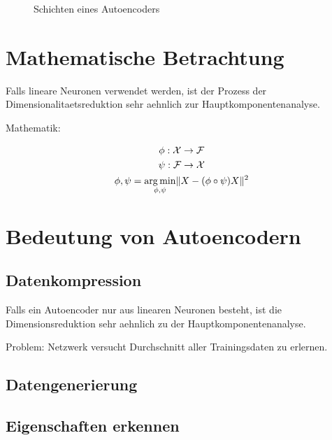 \begin{figure}[h!]
  \label{fi:nn_layers}
  \caption{Schichten eines Autoencoders}
\end{figure}

\section{Mathematische Betrachtung}
Falls lineare Neuronen verwendet werden, ist der Prozess der
Dimensionalitaetsreduktion sehr aehnlich zur Hauptkomponentenanalyse.

Mathematik:


\begin{gather}
  \phi: \mathcal{X} \to \mathcal{F}\\
  \psi: \mathcal{F} \to \mathcal{X}\\
  \displaystyle\phi,\psi = \operatorname*{\arg \min}_{\phi,\psi} \lVert X - (\phi \circ \psi)X\rVert^2
\end{gather}

\section{Bedeutung von Autoencodern}
\subsection{Datenkompression}
Falls ein Autoencoder nur aus linearen Neuronen besteht, ist die
Dimensionsreduktion sehr aehnlich zu der Hauptkomponentenanalyse.

Problem: Netzwerk versucht Durchschnitt aller Trainingsdaten zu erlernen.
\subsection{Datengenerierung}
\subsection{Eigenschaften erkennen}

